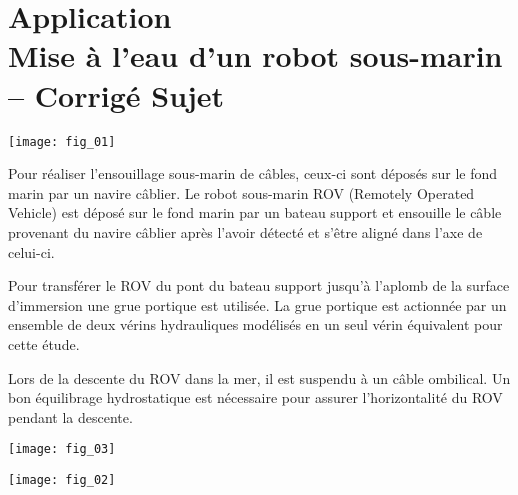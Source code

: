 
\chapter*{Application  \\ 
Mise à l'eau d'un robot sous-marin -- \ifprof Corrigé \else Sujet \fi}

\iflivret {} \else
\ifprof  {} \else \fi
\fi

\setcounter{question}{0}
\begin{marginfigure}
\texttt{[image: fig\_01]}
\end{marginfigure}



\ifprof
\else
Pour réaliser l’ensouillage sous-marin de câbles, ceux-ci sont déposés sur le fond marin par un navire câblier. Le robot sous-marin ROV (Remotely Operated Vehicle) est déposé sur le fond marin par un bateau support et ensouille le câble provenant
du navire câblier après l’avoir détecté et s’être aligné dans l’axe de celui-ci.

Pour transférer le ROV du pont du bateau support jusqu’à l’aplomb de la surface d’immersion une grue portique est utilisée. 
La grue portique est actionnée par un ensemble de deux vérins hydrauliques modélisés en un seul vérin équivalent pour cette étude.

Lors de la descente du ROV dans la mer, il est suspendu à un câble ombilical. Un bon équilibrage hydrostatique est
nécessaire pour assurer l’horizontalité du ROV pendant la descente.

\begin{marginfigure}
\texttt{[image: fig\_03]}
\end{marginfigure}

\begin{center}
\texttt{[image: fig\_02]}
\end{center}

